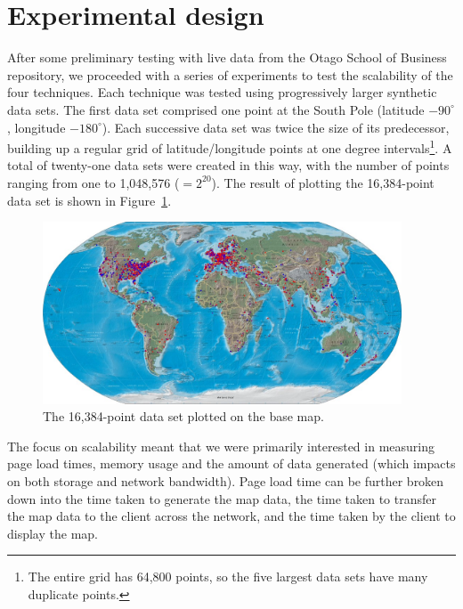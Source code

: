 \documentclass[acmtocl,acmnow]{acmtrans2m}
\begin{document}
\section{Experimental design}
\label{sec-experiment}

After some preliminary testing with live data from the Otago School of
Business repository, we proceeded with a series of experiments to test
the scalability of the four techniques. Each technique was tested using
progressively larger synthetic data sets. The first data set comprised
one point at the South Pole (latitude \(-90^{\circ}\), longitude
\(-180^{\circ}\)). Each successive data set was twice the size of its
predecessor, building up a regular grid of latitude/longitude points at
one degree intervals\footnote{The entire grid has 64,800 points, so the
five largest data sets have many duplicate points.}. A total of
twenty-one data sets were created in this way, with the number of points
ranging from one to 1,048,576 (\(=2^{20}\)). The result of plotting the
16,384-point data set is shown in Figure~\ref{fig-grid-points}.


\begin{figure}
	\begin{center}
		\includegraphics[width=0.95\textwidth,keepaspectratio]{ImageGeneration-full}
	\end{center}
	\caption{The 16,384-point data set plotted on the base map.}
	\label{fig-grid-points}
\end{figure}


The focus on scalability meant that we were primarily interested in
measuring page load times, memory usage and the amount of data
generated (which impacts on both storage and network bandwidth). Page
load time can be further broken down into the time taken to generate the
map data, the time taken to transfer the map data to the client across
the network, and the time taken by the client to display the map.
\end{document}
